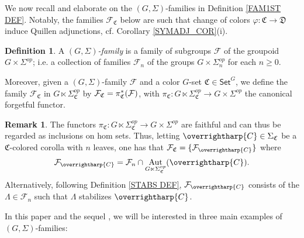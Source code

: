\documentclass[a4paper,10pt
]{article}%
\numberwithin{equation}{section}
\numberwithin{figure}{section}
\theoremstyle{definition} %
\newtheorem{definition}[equation]{Definition}%
\newtheorem{remark}[equation]{Remark}%
\newcommand{\vect}[1]{\text{\overrightharp{\ensuremath{#1}}}}
\DeclareMathOperator{\Aut}{Aut}%
\newcommand{\F}{\ensuremath{\mathcal F}}
\newcommand{\1}{\ensuremath{\mathbbm 1}}%
\begin{document}
We now recall and elaborate on the $(G,\Sigma)$-families in Definition \ref{FAM1ST DEF}.
Notably, the families $\mathcal{F}_{\mathfrak{C}}$ below 
are such that 
change of colors $\varphi \colon \mathfrak{C} \to \mathfrak{D}$ 
induce Quillen adjunctions, cf. Corollary \ref{SYMADJ_COR}(i).




\begin{definition}\label{GSFAM_DEF}
	A \emph{$(G,\Sigma)$-family} is a family of subgroups $\mathcal{F}$ of the groupoid $G \times \Sigma^{op}$;
	i.e.
	a collection of families $\F_n$ of the groups $G\times \Sigma_n^{op}$ for each $n \geq 0$.
        
	Moreover, given a $(G,\Sigma)$-family $\F$ and a color $G$-set $\mathfrak C \in \mathsf{Set}^G$,
	we define the family
	$\mathcal{F}_{\mathfrak{C}}$ in
	$G \ltimes \Sigma^{op}_{\mathfrak{C}}$
	by $\mathcal{F}_{\mathfrak{C}} = \pi^{\**}_{\mathfrak{C}}(\mathcal{F})$,
	with $\pi_{\mathfrak{C}} \colon G \ltimes \Sigma_{\mathfrak{C}}^{op} \to G \times \Sigma^{op}$
	the canonical forgetful functor.
\end{definition}






\begin{remark}\label{FAMC_DEF_REM}
	The functors
	$\pi_{\mathfrak{C}} \colon
	G \ltimes \Sigma_{\mathfrak{C}}^{op} \to
	G \times \Sigma^{op}$
	are faithful and can thus be regarded as inclusions on hom sets.
	Thus, letting $\vect{C} \in \Sigma_{\mathfrak{C}}$ be a
	$\mathfrak{C}$-colored corolla with $n$ leaves,
	one has that
	$\F_{\mathfrak{C}} = \{\F_{\vect{C}}\}$ where
	\begin{equation}\label{FAMC_DEF_EQ}
	\F_{\vect{C}} = \F_n \cap \Aut_{G \ltimes \Sigma_{\mathfrak C}^{op}}(\vect C).
	\end{equation}
	Alternatively, following
	Definition \ref{STABS DEF},
	$\F_{\vect{C}}$ consists of the $\Lambda \in \F_n$
	such that $\Lambda$ stabilizes $\vect{C}$.
\end{remark}



In this paper and the sequel \cite{BP_TAS}, 
we will be interested in three main examples of $(G,\Sigma)$-families:
\end{document}
